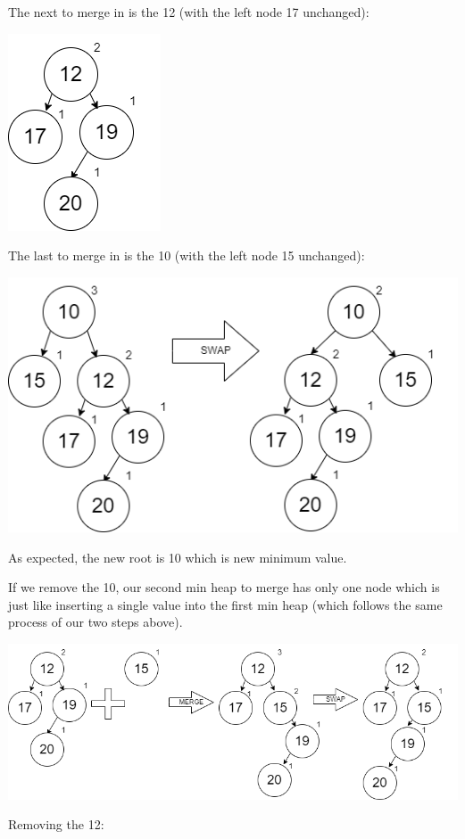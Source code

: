 \documentclass[
]{book}
\begin{document}
The next to merge in is the 12 (with the left node 17 unchanged):

\includegraphics{images/heap_del4.drawio.png}

The last to merge in is the 10 (with the left node 15 unchanged):

\includegraphics{images/heap_del5.drawio.png}

As expected, the new root is 10 which is new minimum value.

If we remove the 10, our second min heap to merge has only one node which is just like inserting a single value into the first min heap (which follows the same process of our two steps above).

\includegraphics{images/heap_del6.drawio.png}

Removing the 12:
\end{document}
